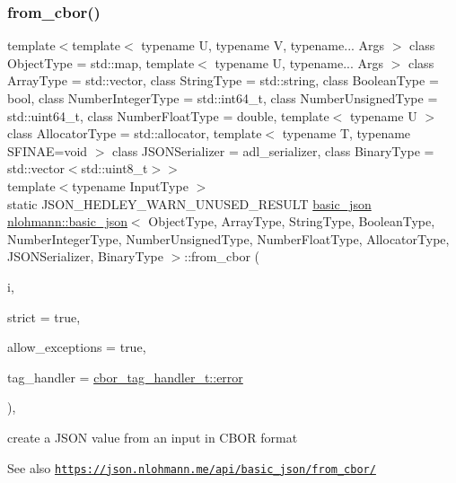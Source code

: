 \subsubsection{\texorpdfstring{from\+\_\+cbor()}{from\_cbor()}\hspace{0.1cm}{\footnotesize\ttfamily [1/2]}}
{\footnotesize\ttfamily template$<$template$<$ typename U, typename V, typename... Args $>$ class Object\+Type = std\+::map, template$<$ typename U, typename... Args $>$ class Array\+Type = std\+::vector, class String\+Type  = std\+::string, class Boolean\+Type  = bool, class Number\+Integer\+Type  = std\+::int64\+\_\+t, class Number\+Unsigned\+Type  = std\+::uint64\+\_\+t, class Number\+Float\+Type  = double, template$<$ typename U $>$ class Allocator\+Type = std\+::allocator, template$<$ typename T, typename S\+F\+I\+N\+A\+E=void $>$ class J\+S\+O\+N\+Serializer = adl\+\_\+serializer, class Binary\+Type  = std\+::vector$<$std\+::uint8\+\_\+t$>$$>$ \\
template$<$typename Input\+Type $>$ \\
static J\+S\+O\+N\+\_\+\+H\+E\+D\+L\+E\+Y\+\_\+\+W\+A\+R\+N\+\_\+\+U\+N\+U\+S\+E\+D\+\_\+\+R\+E\+S\+U\+LT \hyperlink{classnlohmann_1_1basic__json}{basic\+\_\+json} \hyperlink{classnlohmann_1_1basic__json}{nlohmann\+::basic\+\_\+json}$<$ Object\+Type, Array\+Type, String\+Type, Boolean\+Type, Number\+Integer\+Type, Number\+Unsigned\+Type, Number\+Float\+Type, Allocator\+Type, J\+S\+O\+N\+Serializer, Binary\+Type $>$\+::from\+\_\+cbor (\begin{DoxyParamCaption}\item[{Input\+Type \&\&}]{i,  }\item[{const bool}]{strict = {\ttfamily true},  }\item[{const bool}]{allow\+\_\+exceptions = {\ttfamily true},  }\item[{const \hyperlink{namespacenlohmann_1_1detail_a58bb1ef1a9ad287a9cfaf1855784d9ac}{cbor\+\_\+tag\+\_\+handler\+\_\+t}}]{tag\+\_\+handler = {\ttfamily \hyperlink{namespacenlohmann_1_1detail_a58bb1ef1a9ad287a9cfaf1855784d9acacb5e100e5a9a3e7f6d1fd97512215282}{cbor\+\_\+tag\+\_\+handler\+\_\+t\+::error}} }\end{DoxyParamCaption})\hspace{0.3cm}{\ttfamily [inline]}, {\ttfamily [static]}}



create a J\+S\+ON value from an input in C\+B\+OR format 

\begin{DoxySeeAlso}{See also}
\href{https://json.nlohmann.me/api/basic_json/from_cbor/}{\tt https\+://json.\+nlohmann.\+me/api/basic\+\_\+json/from\+\_\+cbor/} 
\end{DoxySeeAlso}
\mbox{\label{classnlohmann_1_1basic__json_aba4f6fc79cc405fb212ea3d992334e71}} 
